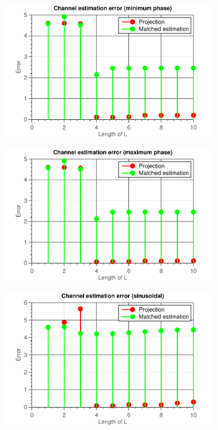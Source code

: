 \documentclass[11pt,titlepage]{report}
\begin{document}
\begin{figure}[H]
	\centering
	\begin{subfigure}{0.49\textwidth}
		\includegraphics[width=\textwidth]{resource/ass-1-report-9-minimum-phase-noise.pdf}
	\end{subfigure}
	\begin{subfigure}{0.49\textwidth}
		\includegraphics[width=\textwidth]{resource/ass-1-report-9-maximum-phase-noise.pdf}
	\end{subfigure}
	\begin{subfigure}{0.49\textwidth}
		\includegraphics[width=\textwidth]{resource/ass-1-report-9-sinusoidal-noise.pdf}

\end{subfigure}
\end{figure}
\end{document}
